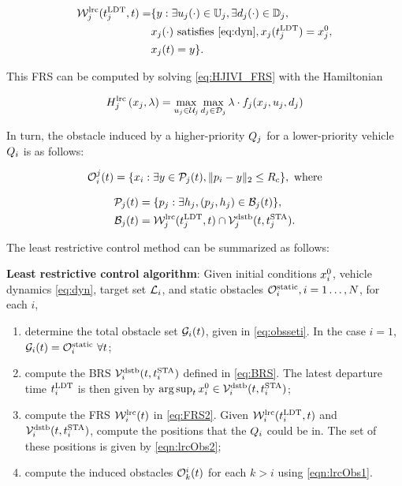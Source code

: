 \begin{equation}
\label{eq:FRS2}
\begin{aligned}
\frs_j^\text{lrc}(\ldt_j, t) = & \{y: \exists \ctrl_j(\cdot)\in\cfset_j, \exists \dstb_j(\cdot) \in \dfset_j, \\
& \state_j(\cdot) \text{ satisfies \eqref{eq:dyn}}, \state_j(\ldt_j) = \state_{j}^0,\\
& \state_j(t) = y\}.
\end{aligned}
\end{equation}

This FRS can be computed by solving \eqref{eq:HJIVI_FRS} with the Hamiltonian

\begin{equation}
H_j^\text{lrc}\left(x_j, \lambda\right) = \max_{u_j \in \mathcal{U}_j} \max_{d_j \in \mathcal{D}_j} \lambda \cdot f_j(x_j, u_j, d_j)
\end{equation}

In turn, the obstacle induced by a higher-priority $Q_j$ for a lower-priority vehicle $Q_i$ is as follows:

\begin{equation}
\label{eqn:lrcObs1}
\ioset_i^j(t) = \{\state_i: \exists y \in \pfrs_j(t), \|\pos_i - y\|_2 \le \rc \}, \text{ where}
\end{equation}

\begin{align}
\pfrs_j(t) & = \{p_j: \exists \npos_j, (p_j, \npos_j) \in \boset_j(t) \}, \label{eqn:lrcObs2}\\
\boset_j(t) & = \frs_j^\text{lrc}(\ldt_j, t) \cap \brs_j^\text{dstb}(t, \sta_j). \label{eqn:lrcObs3}
\end{align}

The least restrictive control method can be summarized as follows:
\begin{alg}
\label{alg:lrc}
\textbf{Least restrictive control algorithm}: Given initial conditions $x_i^0$, vehicle dynamics \eqref{eq:dyn}, target set $\mathcal{L}_i$, and static obstacles $\mathcal{O}^\text{static}_i, i = 1\ldots, N$, for each $i$,
\begin{enumerate}
\item determine the total obstacle set $\mathcal{G}_i(t)$, given in \eqref{eq:obsseti}. In the case $i=1$, $\mathcal{G}_i(t) = \mathcal{O}^\text{static}_i ~ \forall t$;
\item compute the BRS $\mathcal{V}_i^\text{dstb}(t, t^\text{STA}_i)$ defined in \eqref{eq:BRS}. The latest departure time $t^\text{LDT}_i$ is then given by $\arg \sup_t x_{i}^0 \in \mathcal{V}_i^\text{dstb}(t, t^\text{STA}_i)$;
\item compute the FRS $\mathcal{W}_i^\text{lrc}(t)$ in \eqref{eq:FRS2}. Given $\mathcal{W}_i^\text{lrc}(t^\text{LDT}_i, t)$ and $\mathcal{V}_i^\text{dstb}(t, t^\text{STA}_i)$, compute the positions that the $Q_i$ could be in. The set of these positions is given by \eqref{eqn:lrcObs2};
\item compute the induced obstacles $\mathcal{O}_k^i(t)$ for each $k>i$ using \eqref{eqn:lrcObs1}.
\end{enumerate}
\end{alg}

